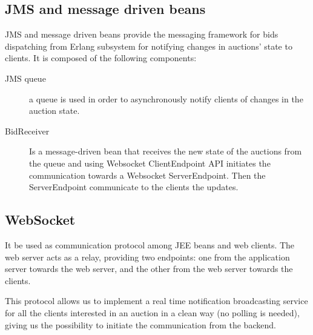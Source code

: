\subsection{JMS and message driven beans}

JMS and message driven beans provide the messaging framework for bids
dispatching from Erlang subsystem for notifying changes in auctions’ state to
clients. It is composed of the following components:

\begin{description}
	\item[JMS queue] a queue is used in order to asynchronously notify
		clients of changes in the auction state.
	\item[BidReceiver] Is a message-driven bean that receives the new state
		of the auctions from the queue and using Websocket
		ClientEndpoint API initiates the communication towards a
		Websocket ServerEndpoint. Then the ServerEndpoint communicate to
		the clients the updates.
\end{description}

\subsection{WebSocket}

It be used as communication protocol among JEE beans and web clients. The web
server acts as a relay, providing two endpoints: one from the application server
towards the web server, and the other from the web server towards the clients.

This protocol allows us to implement a real time notification broadcasting
service for all the clients interested in an auction in a clean way (no polling
is needed), giving us the possibility to initiate the communication from the
backend.
